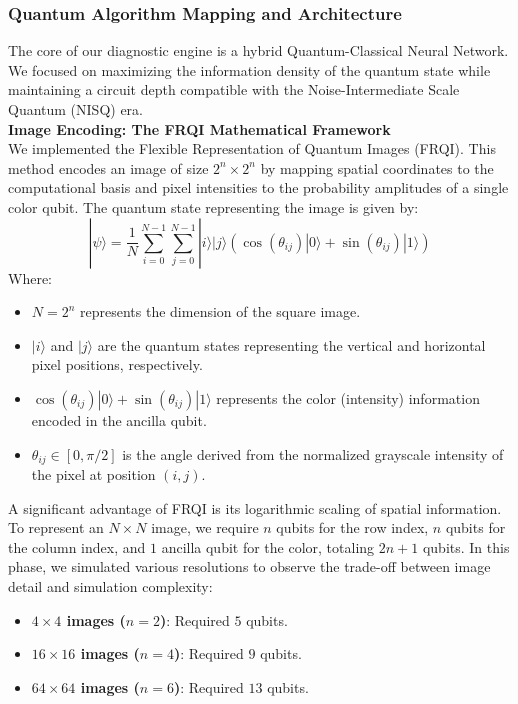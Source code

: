 \documentclass{oqireport}
\begin{document}
\subsubsection{Quantum Algorithm Mapping and Architecture}
The core of our diagnostic engine is a hybrid Quantum-Classical Neural Network. We focused on maximizing the information density of the quantum state while maintaining a circuit depth compatible with the Noise-Intermediate Scale Quantum (NISQ) era. \\

{\large \textbf{Image Encoding: The FRQI Mathematical Framework}} \\
We implemented the Flexible Representation of Quantum Images (FRQI). This method encodes an image of size $2^n \times 2^n$ by mapping spatial coordinates to the computational basis and pixel intensities to the probability amplitudes of a single color qubit. The quantum state representing the image is given by:
\begin{equation}
|\psi\rangle = \frac{1}{N} \sum_{i=0}^{N-1} \sum_{j=0}^{N-1} |i\rangle |j\rangle (\cos(\theta_{ij})|0\rangle + \sin(\theta_{ij})|1\rangle)
\end{equation}
Where:
\begin{itemize}
    \item $N = 2^n$ represents the dimension of the square image.
    \item $|i\rangle$ and $|j\rangle$ are the quantum states representing the vertical and horizontal pixel positions, respectively. 
    \item $\cos(\theta_{ij})|0\rangle + \sin(\theta_{ij})|1\rangle$ represents the color (intensity) information encoded in the ancilla qubit.
    \item $\theta_{ij} \in [0, \pi/2]$ is the angle derived from the normalized grayscale intensity of the pixel at position $(i, j)$.
\end{itemize}

A significant advantage of FRQI is its logarithmic scaling of spatial information. To represent an $N \times N$ image, we require $n$ qubits for the row index, $n$ qubits for the column index, and $1$ ancilla qubit for the color, totaling $2n + 1$ qubits. In this phase, we simulated various resolutions to observe the trade-off between image detail and simulation complexity:
\begin{itemize}
    \item \textbf{$4 \times 4$ images ($n=2$)}: Required $5$ qubits.
    \item \textbf{$16 \times 16$ images ($n=4$)}: Required $9$ qubits.
    \item \textbf{$64 \times 64$ images ($n=6$)}: Required $13$ qubits.
\end{itemize}
\end{document}
